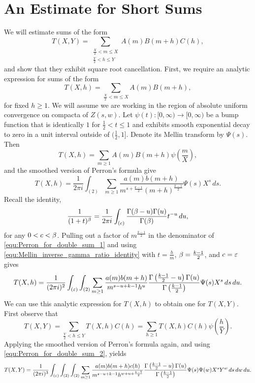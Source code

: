 \documentclass[12pt,reqno,oneside]{amsart}
\begin{document}
\section{An Estimate for Short Sums}
  We will estimate sums of the form
  \[
    T(X,Y) = \sum_{\substack{\frac{X}{2} < m \le X \\ \frac{Y}{2} < h \le Y}}A(m)B(m+h)C(h),
  \]
  and show that they exhibit square root cancellation. First, we require an analytic expression for sums of the form
  \[
    T(X,h) = \sum_{\frac{X}{2} < m \le X}A(m)B(m+h),
  \]
  for fixed $h \ge 1$. We will assume we are working in the region of absolute uniform convergence on compacta of $Z(s,w)$. Let $\psi(t):[0,\infty) \to [0,\infty)$ be a bump function that is identically $1$ for $\frac{1}{2} < t \le 1$ and exhibits smooth exponential decay to zero in a unit interval outside of $\big(\frac{1}{2},1\big]$. Denote its Mellin transform by $\Psi(s)$. Then
  \[
    T(X,h) = \sum_{m \ge 1}A(m)B(m+h)\psi\left(\frac{m}{X}\right),
  \]
  and the smoothed version of Perron's formula give
  \begin{equation}\label{equ:Perron_for_double_sum_1}
    T(X,h) = \frac{1}{2\pi i}\int_{(2)}\sum_{m \ge 1}\frac{a(m)b(m+h)}{m^{s+\frac{k-1}{2}}(m+h)^{\frac{k-1}{2}}}\Psi(s)X^{s}\,ds.
  \end{equation}
  Recall the identity,
  \begin{equation}\label{equ:Mellin_inverse_gamma_ratio_identity}
    \frac{1}{(1+t)^{\beta}} = \frac{1}{2\pi i}\int_{(c)}\frac{\Gamma(\beta-u)\Gamma(u)}{\Gamma(\beta)}t^{-u}\,du,
  \end{equation}
  for any $0 < c < \beta$. Pulling out a factor of $m^{\frac{k-1}{2}}$ in the denominator of \cref{equ:Perron_for_double_sum_1} and using \cref{equ:Mellin_inverse_gamma_ratio_identity} with $t = \frac{h}{m}$, $\beta = \frac{k-1}{2}$, and $c = \varepsilon$ gives
  \begin{equation}\label{equ:Perron_for_double_sum_2}
    T(X,h) = \frac{1}{(2\pi i)^{2}}\int_{(\varepsilon)}\int_{(2)}\sum_{m \ge 1}\frac{a(m)b(m+h)}{m^{s-u+k-1}h^{u}}\frac{\Gamma\left(\frac{k-1}{2}-u\right)\Gamma(u)}{\Gamma\left(\frac{k-1}{2}\right)}\Psi(s)X^{s}\,ds\,du.
  \end{equation}
  We can use this analytic expression for $T(X,h)$ to obtain one for $T(X,Y)$. First observe that
  \[
    T(X,Y) = \sum_{\frac{Y}{2} < h \le Y}T(X,h)C(h) = \sum_{h \ge 1}T(X,h)C(h)\psi\left(\frac{h}{Y}\right).
  \]
  Applying the smoothed version of Perron's formula again, and using \cref{equ:Perron_for_double_sum_2}, yields
  \begin{equation}\label{equ:Perron_for_triple_sum_1}
    T(X,Y) = \frac{1}{(2\pi i)^{3}}\int_{(\varepsilon)}\int_{(2)}\int_{(2)}\sum_{m \ge 1}\frac{a(m)b(m+h)c(h)}{m^{s-u+k-1}h^{w+u+\frac{k-1}{2}}}\frac{\Gamma\left(\frac{k-1}{2}-u\right)\Gamma(u)}{\Gamma\left(\frac{k-1}{2}\right)}\Psi(s)\Psi(w)X^{s}Y^{w}\,ds\,dw\,du.
  \end{equation}
\end{document}
